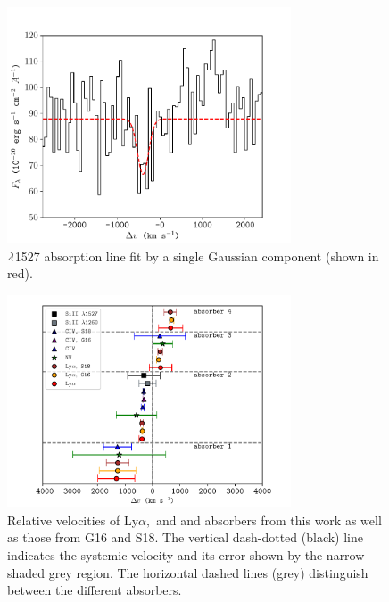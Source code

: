 \begin{figure}
\centering 
\includegraphics[width=0.75\textwidth]{plots_chp3/SiII_1526.pdf}
\caption[ $\lam$1527 absorption line in MUSE and its best fit]{ $\lam$1527 absorption line fit by a single Gaussian component (shown in red). }
\label{fig:SiII_1526-fit}
\end{figure}

\begin{figure} 
\centering
 \includegraphics[width=0.75\textwidth]{plots_chp3/absorber_velocities.pdf}
 \caption[Velocity shifts of absorbers for resonant ions]{Relative velocities of Ly$\alpha,$  and  and  absorbers from this work as well as those from G16 and S18. The vertical dash-dotted (black) line indicates the systemic velocity and its error shown by the narrow shaded grey region. The horizontal dashed lines (grey) distinguish between the different absorbers.}
 \label{fig:abs-vel}
\end{figure}

